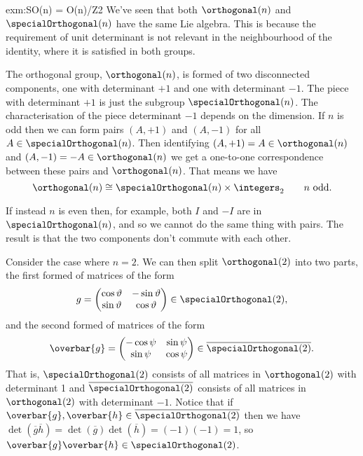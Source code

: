 \documentclass[fleqn]{NotesClass}
\newcommand{\isomorphic}{\cong}
\begin{document}
    \begin{exm}{}{exm:SO(n) = O(n)/Z2}
        We've seen that both \(\orthogonal(n)\) and \(\specialOrthogonal(n)\) have the same Lie algebra.
        This is because the requirement of unit determinant is not relevant in the neighbourhood of the identity, where it is satisfied in both groups.
        
        The orthogonal group, \(\orthogonal(n)\), is formed of two disconnected components, one with determinant \(+1\) and one with determinant \(-1\).
        The piece with determinant \(+1\) is just the subgroup \(\specialOrthogonal(n)\).
        The characterisation of the piece determinant \(-1\) depends on the dimension.
        If \(n\) is odd then we can form pairs \((A, +1)\) and \((A, -1)\) for all \(A \in \specialOrthogonal(n)\).
        Then identifying \((A, +1) = A \in \orthogonal(n)\) and \((A, -1) = -A \in \orthogonal(n)\) we get a one-to-one correspondence between these pairs and \(\orthogonal(n)\).
        That means we have
        \begin{equation}
            \orthogonal(n) \isomorphic \specialOrthogonal(n) \times \integers_2 \qquad n \text{ odd}.
        \end{equation}
        
        If instead \(n\) is even then, for example, both \(I\) and \(-I\) are in \(\specialOrthogonal(n)\), and so we cannot do the same thing with pairs.
        The result is that the two components don't commute with each other.
        
        Consider the case where \(n = 2\).
        We can then split \(\orthogonal(2)\) into two parts, the first formed of matrices of the form
        \begin{equation}
            g = 
            \begin{pmatrix}
                \cos \vartheta & -\sin \vartheta\\
                \sin \vartheta & \cos \vartheta
            \end{pmatrix}
            \in \specialOrthogonal(2),
        \end{equation}
        and the second formed of matrices of the form
        \begin{equation}
            \overbar{g} = 
            \begin{pmatrix}
                -\cos \psi & \sin \psi\\
                \sin \psi & \cos \psi
            \end{pmatrix}
            \in \overline{\specialOrthogonal(2)}.
        \end{equation}
        That is, \(\specialOrthogonal(2)\) consists of all matrices in \(\orthogonal(2)\) with determinant 1 and \(\overline{\specialOrthogonal(2)}\) consists of all matrices in \(\orthogonal(2)\) with determinant \(-1\).
        Notice that if \(\overbar{g}, \overbar{h} \in \overline{\specialOrthogonal(2)}\) then we have \(\det(\overbar{g}\overbar{h}) = \det(\overbar{g})\det(\overbar{h}) = (-1)(-1) = 1\), so \(\overbar{g}\overbar{h} \in \specialOrthogonal(2)\).
        

\end{exm}
\end{document}
